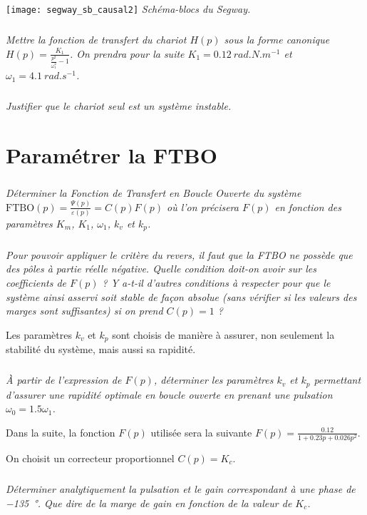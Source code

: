 \begin{multicols}{2}
\begin{center}%
\texttt{[image: segway\_sb\_causal2]}
\textit{Schéma-blocs du Segway\textregistered.} \label{ex_segway_SB}
\end{center}%

\subparagraph{}\textit{Mettre la fonction de transfert du chariot $H(p)$ sous la forme canonique $H(p)=\frac{K_1}{\frac{p^2}{\omega_1^2}-1}$. On prendra pour la suite $K_1=\SI{0.12}{rad. N.m^{-1}}$ et $\omega_1=\SI{4.1}{rad. s^{-1}}$.}

\subparagraph{}\textit{Justifier que le chariot seul est un système instable.}

\section*{Paramétrer la FTBO}



\subparagraph{}\textit{Déterminer la Fonction de Transfert en Boucle Ouverte du système $\textrm{FTBO}(p)=\frac{\Psi(p)}{\varepsilon(p)} = C(p)F(p)$ où l'on précisera $F(p)$ en fonction des paramètres $K_m$, $K_1$, $\omega_1$, $k_v$ et $k_p$.}

\subparagraph{}\textit{Pour pouvoir appliquer le critère du revers, il faut que la FTBO ne possède que des pôles à partie réelle négative. Quelle condition doit-on avoir sur les coefficients de $F(p)$ ? Y a-t-il d'autres conditions à respecter pour que le système ainsi asservi soit stable de façon absolue (sans vérifier si les valeurs des marges sont suffisantes) si on prend $C(p)=1$ ?}

Les paramètres $k_v$ et $k_p$ sont choisis de manière à assurer, non seulement la stabilité du système, mais aussi sa rapidité.

\subparagraph{}\textit{\`A partir de l'expression de $F(p)$, déterminer les paramètres $k_v$ et $k_p$ permettant d'assurer une rapidité optimale en boucle ouverte en prenant une pulsation $\omega_0=\num{1.5} \omega_1$. }


Dans la suite, la fonction $F(p)$ utilisée sera la suivante $F(p)=\frac{\num{0.12}}{1+\num{0.23} p + \num{0.026} p^2}$.

On choisit un correcteur proportionnel $C(p)=K_c$.


\subparagraph{}\textit{Déterminer analytiquement la pulsation et le gain correspondant à une phase de \SI{-135}{\degree}. Que dire de la marge de gain en fonction de la valeur de $K_c$.}


\end{multicols}
